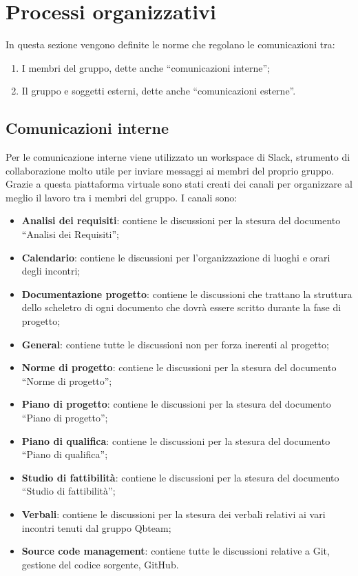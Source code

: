 \section{Processi organizzativi}
In questa sezione vengono definite le norme che regolano le comunicazioni tra:
\begin{enumerate}
	\item I membri del gruppo, dette anche “comunicazioni interne”;
	\item Il gruppo e soggetti esterni, dette anche “comunicazioni esterne”.
	
	\end{enumerate}
	
\subsection{Comunicazioni interne}
Per le comunicazione interne viene utilizzato un workspace di Slack,
strumento di collaborazione molto utile per inviare messaggi ai membri del proprio gruppo.
Grazie a questa piattaforma virtuale sono stati creati dei canali per organizzare al meglio il lavoro tra i membri del gruppo.
I canali sono:
\begin{itemize}
	\item \textbf{Analisi dei requisiti}:  contiene le discussioni per la stesura del documento “Analisi dei Requisiti”;
	\item \textbf{Calendario}: contiene le discussioni per l’organizzazione di luoghi e orari degli incontri;
	\item \textbf{Documentazione progetto}: contiene le discussioni che trattano la struttura dello scheletro di ogni documento che dovrà essere scritto durante la fase di progetto;
	\item \textbf{General}: contiene tutte le discussioni non per forza inerenti al progetto;
	\item \textbf{Norme di progetto}: contiene le discussioni per la stesura del documento “Norme di progetto”;
        \item \textbf{Piano di progetto}: contiene le discussioni per la stesura del documento “Piano di progetto”;
	\item \textbf{Piano di qualifica}: contiene le discussioni per la stesura del documento “Piano di qualifica”;
	\item \textbf{Studio di fattibilità}: contiene le discussioni per la stesura del documento “Studio di fattibilità”;
	\item \textbf{Verbali}: contiene le discussioni per la stesura dei verbali relativi ai vari incontri tenuti dal gruppo Qbteam;
	\item \textbf{Source code management}: contiene tutte le discussioni relative a Git, gestione del codice sorgente, GitHub.
\end{itemize}

